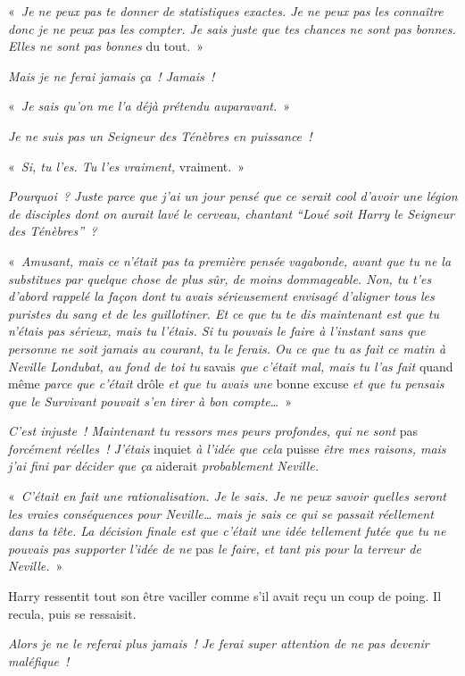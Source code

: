 «~\emph{Je ne peux pas te donner de statistiques exactes.
Je ne peux pas les connaître donc je ne peux pas les compter.
Je sais juste que tes chances ne sont pas bonnes.
Elles ne sont pas bonnes} du tout.~»

\emph{Mais je ne ferai jamais ça~! Jamais~!}

«~\emph{Je sais qu'on me l'a déjà prétendu auparavant.}~»

\emph{Je ne suis pas un Seigneur des Ténèbres en puissance~!}

«~\emph{Si, tu l'es. Tu l'es vraiment,} vraiment.~»

\emph{Pourquoi~? Juste parce que j'ai un jour pensé que ce serait cool d'avoir une légion de disciples dont on aurait lavé le cerveau, chantant “Loué soit Harry le Seigneur des Ténèbres”~?}

«~\emph{Amusant, mais ce n'était pas ta première pensée vagabonde, avant que tu ne la substitues par quelque chose de plus sûr, de moins dommageable.
Non, tu t'es d'abord rappelé la façon dont tu avais sérieusement envisagé d'aligner tous les puristes du sang et de les guillotiner.
Et ce que tu te dis maintenant est que tu n'étais pas sérieux, mais tu l'étais.
Si tu pouvais le faire à l'instant sans que personne ne soit jamais au courant, tu le ferais.
Ou ce que tu as fait ce matin à Neville Londubat, au fond de toi tu} savais \emph{que c'était mal, mais tu l'as fait} quand même \emph{parce que c'était} drôle \emph{et que tu avais une} bonne excuse \emph{et que tu pensais que le Survivant pouvait s'en tirer à bon compte…}~»

\emph{C'est injuste~! Maintenant tu ressors mes peurs profondes, qui ne sont} pas \emph{forcément réelles~!
J'étais} inquiet \emph{à l'idée que cela} puisse \emph{être mes raisons, mais j'ai fini par décider que ça} aiderait \emph{probablement Neville.}

«~\emph{C'était en fait une rationalisation.
Je le sais.
Je ne peux savoir quelles seront les vraies conséquences pour Neville… mais je sais ce qui se passait réellement dans ta tête.
La décision finale est que c'était une idée tellement futée que tu ne pouvais pas supporter l'idée de ne} pas \emph{le faire, et tant pis pour la terreur de Neville.}~»

Harry ressentit tout son être vaciller comme s'il avait reçu un coup de poing.
Il recula, puis se ressaisit.

\emph{Alors je ne le referai plus jamais~!
Je ferai super attention de ne pas devenir maléfique~!}

